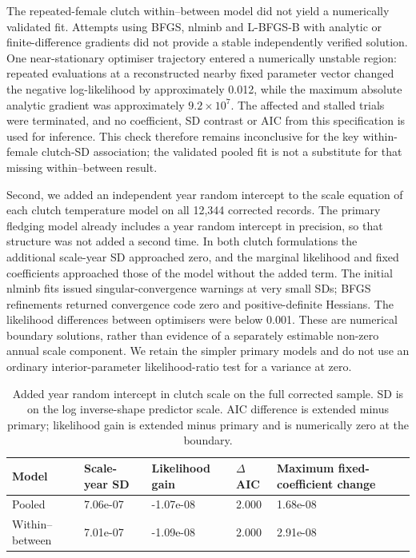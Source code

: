 \documentclass{article}
\begin{document}
The repeated-female clutch within--between model did not yield a numerically validated fit. Attempts using BFGS, nlminb and L-BFGS-B with analytic or finite-difference gradients did not provide a stable independently verified solution. One near-stationary optimiser trajectory entered a numerically unstable region: repeated evaluations at a reconstructed nearby fixed parameter vector changed the negative log-likelihood by approximately 0.012, while the maximum absolute analytic gradient was approximately $9.2\times10^7$. The affected and stalled trials were terminated, and no coefficient, SD contrast or AIC from this specification is used for inference. This check therefore remains inconclusive for the key within-female clutch-SD association; the validated pooled fit is not a substitute for that missing within--between result.

Second, we added an independent year random intercept to the scale equation of each clutch temperature model on all 12,344 corrected records. The primary fledging model already includes a year random intercept in precision, so that structure was not added a second time. In both clutch formulations the additional scale-year SD approached zero, and the marginal likelihood and fixed coefficients approached those of the model without the added term. The initial nlminb fits issued singular-convergence warnings at very small SDs; BFGS refinements returned convergence code zero and positive-definite Hessians. The likelihood differences between optimisers were below 0.001. These are numerical boundary solutions, rather than evidence of a separately estimable non-zero annual scale component. We retain the simpler primary models and do not use an ordinary interior-parameter likelihood-ratio test for a variance at zero.

\begin{table}[!ht]\centering\scriptsize\singlespacing
\caption{Added year random intercept in clutch scale on the full corrected sample. SD is on the log inverse-shape predictor scale. AIC difference is extended minus primary; likelihood gain is extended minus primary and is numerically zero at the boundary.}\label{tab:scale-year-boundary}
\begin{tabular}{lllll}\toprule
Model & Scale-year SD & Likelihood gain & $\Delta$AIC & Maximum fixed-coefficient change\\\midrule
Pooled & 7.06e-07 & -1.07e-08 & 2.000 & 1.68e-08\\
Within--between & 7.01e-07 & -1.09e-08 & 2.000 & 2.91e-08\\
\bottomrule\end{tabular}\end{table}
\end{document}
